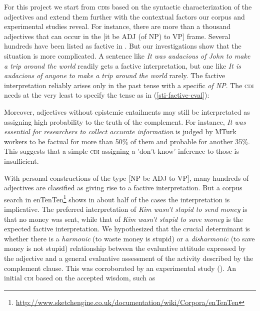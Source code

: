 \documentclass[10pt]{article}
\begin{document}
For this project we start from \textsc{cdi}s based on the syntactic characterization of the adjectives and extend them further with the contextual factors our corpus and experimental studies reveal. For instance, there are more than a thousand adjectives that can occur in the [it be ADJ (of NP) to VP] frame. Several hundreds have been listed as factive in \cite{norrick:1978}. But our investigations show that the situation is more complicated. A sentence like \textit{It was audacious of John to make a trip around the world} readily gets a factive interpretation, but one like \textit{It is audacious of anyone to make a trip around the world} rarely. The factive interpretation reliably arises only in the past tense with a specific \textit{of NP}. The \textsc{cdi} needs at the very least to specify the tense as in (\ref{sti-factive-eval}):

\vspace{-0.6em}
\vspace{-0.6em}
Moreover, adjectives without epistemic entailments may still be interpretated as assigning high probability to the truth of the complement. For instance, \textit{It was essential for researchers to collect accurate information} is judged by MTurk workers to be factual for more than 50\% of them and probable for another 35\%. This suggests that a simple \textsc{cdi} assigning a 'don't know' inference to those is insufficient. 

 
With personal constructions of the type [NP be ADJ to VP], many hundreds of adjectives are classified as giving rise to a factive interpretation. But a corpus search in enTenTen\footnote{\url{http://www.sketchengine.co.uk/documentation/wiki/Corpora/enTenTen}} shows in about half of the cases the interpretation is implicative. The preferred interpretation of \textit{Kim wasn't stupid to send money} is that no money was sent, while that of \textit{Kim wasn't stupid to save money} is the expected factive interpretation. We hypothesized that the crucial determinant is whether there is a \emph{harmonic} (to waste money is stupid) or a \emph{disharmonic} (to save money is not stupid) relationship between the evaluative attitude expressed by the adjective and a general evaluative assessment of the activity described by the complement clause. This was corroborated by an experimental study (\cite{csli-gang-cssp13}). An initial \textsc{cdi} based on the accepted wisdom, such as 
\end{document}
